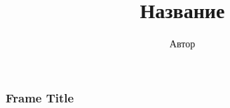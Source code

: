 \documentclass{beamer}
\title{Название}
\author{Автор}
\begin{document}
	\begin{frame}[plain]
		\maketitle
	\end{frame}
	\begin{frame}
		\frametitle{Frame Title}
	\end{frame}
\end{document}
